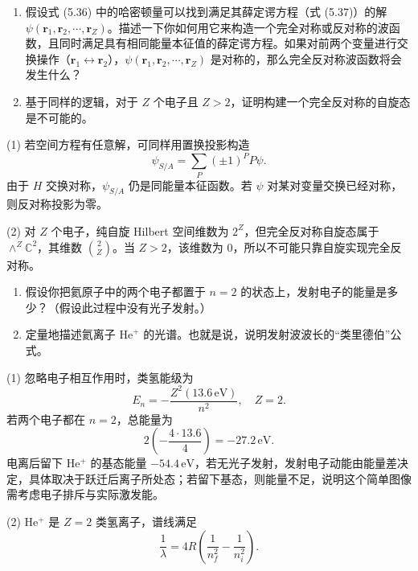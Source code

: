 \begin{question}
\begin{enumerate}
\item 假设式 (5.36) 中的哈密顿量可以找到满足其薛定谔方程（式 (5.37)）的解 $\psi(\mathbf r_1,\mathbf r_2,\cdots,\mathbf r_Z)$。描述一下你如何用它来构造一个完全对称或反对称的波函数，且同时满足具有相同能量本征值的薛定谔方程。如果对前两个变量进行交换操作（$\mathbf r_1\leftrightarrow\mathbf r_2$），$\psi(\mathbf r_1,\mathbf r_2,\cdots,\mathbf r_Z)$ 是对称的，那么完全反对称波函数将会发生什么？
\item 基于同样的逻辑，对于 $Z$ 个电子且 $Z>2$，证明构建一个完全反对称的自旋态是不可能的。
\end{enumerate}

\par\smallskip
{}

\end{question}
\begin{solution}

(1) 若空间方程有任意解，可同样用置换投影构造
\[
\psi_{S/A}=\sum_P(\pm1)^P P\psi.
\]
由于 $H$ 交换对称，$\psi_{S/A}$ 仍是同能量本征函数。若 $\psi$ 对某对变量交换已经对称，则反对称投影为零。

(2) 对 $Z$ 个电子，纯自旋 Hilbert 空间维数为 $2^Z$，但完全反对称自旋态属于 $\wedge^Z\mathbb C^2$，其维数 $\binom2Z$。当 $Z>2$，该维数为 0，所以不可能只靠自旋实现完全反对称。

\end{solution}

\begin{question}
\begin{enumerate}
\item 假设你把氦原子中的两个电子都置于 $n=2$ 的状态上，发射电子的能量是多少？（假设此过程中没有光子发射。）
\item 定量地描述氦离子 $\mathrm{He}^{+}$ 的光谱。也就是说，说明发射波波长的“类里德伯”公式。
\end{enumerate}
\end{question}
\begin{solution}

(1) 忽略电子相互作用时，类氢能级为
\[
E_n=-\frac{Z^2(13.6\,\mathrm{eV})}{n^2},\quad Z=2.
\]
若两个电子都在 $n=2$，总能量为
\[
2\left(-\frac{4\cdot13.6}{4}\right)=-27.2\,\mathrm{eV}.
\]
电离后留下 He$^+$ 的基态能量 $-54.4\,\mathrm{eV}$，若无光子发射，发射电子动能由能量差决定，具体取决于跃迁后离子所处态；若留下基态，则能量不足，说明这个简单图像需考虑电子排斥与实际激发能。

(2) He$^+$ 是 $Z=2$ 类氢离子，谱线满足
\[
\frac1\lambda=4R\left(\frac1{n_f^2}-\frac1{n_i^2}\right).
\]

\end{solution}

